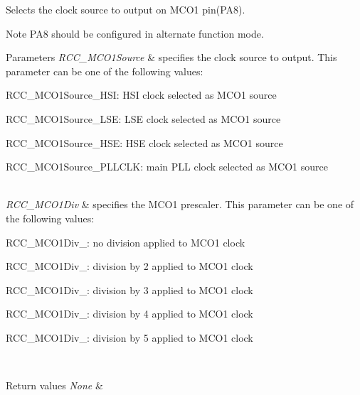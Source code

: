 Selects the clock source to output on M\+C\+O1 pin(\+P\+A8). 

\begin{DoxyNote}{Note}
P\+A8 should be configured in alternate function mode. 
\end{DoxyNote}

\begin{DoxyParams}{Parameters}
{\em R\+C\+C\+\_\+\+M\+C\+O1\+Source} & specifies the clock source to output. This parameter can be one of the following values\+: \begin{DoxyItemize}
\item R\+C\+C\+\_\+\+M\+C\+O1\+Source\+\_\+\+H\+SI\+: H\+SI clock selected as M\+C\+O1 source \item R\+C\+C\+\_\+\+M\+C\+O1\+Source\+\_\+\+L\+SE\+: L\+SE clock selected as M\+C\+O1 source \item R\+C\+C\+\_\+\+M\+C\+O1\+Source\+\_\+\+H\+SE\+: H\+SE clock selected as M\+C\+O1 source \item R\+C\+C\+\_\+\+M\+C\+O1\+Source\+\_\+\+P\+L\+L\+C\+LK\+: main P\+LL clock selected as M\+C\+O1 source \end{DoxyItemize}
\\
\hline
{\em R\+C\+C\+\_\+\+M\+C\+O1\+Div} & specifies the M\+C\+O1 prescaler. This parameter can be one of the following values\+: \begin{DoxyItemize}
\item R\+C\+C\+\_\+\+M\+C\+O1\+Div\+\_\+: no division applied to M\+C\+O1 clock \item R\+C\+C\+\_\+\+M\+C\+O1\+Div\+\_\+: division by 2 applied to M\+C\+O1 clock \item R\+C\+C\+\_\+\+M\+C\+O1\+Div\+\_\+: division by 3 applied to M\+C\+O1 clock \item R\+C\+C\+\_\+\+M\+C\+O1\+Div\+\_\+: division by 4 applied to M\+C\+O1 clock \item R\+C\+C\+\_\+\+M\+C\+O1\+Div\+\_\+: division by 5 applied to M\+C\+O1 clock \end{DoxyItemize}
\\
\hline
\end{DoxyParams}

\begin{DoxyRetVals}{Return values}
{\em None} & \\
\hline
\end{DoxyRetVals}
\mbox{\label{group___r_c_c___group1_gaf50f10675b747de60c739e44e5c22aee}} 
